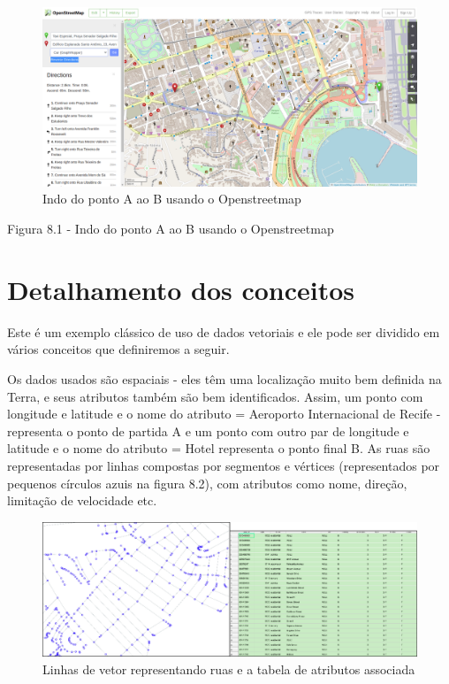 \documentclass[
]{book}
\begin{document}
\begin{figure}
\centering
\includegraphics{media/modulo8/fig81.png}
\caption{Indo do ponto A ao B usando o Openstreetmap}
\end{figure}

Figura 8.1 - Indo do ponto A ao B usando o Openstreetmap

\hypertarget{detalhamento-dos-conceitos-5}{%
\section{Detalhamento dos conceitos}\label{detalhamento-dos-conceitos-5}}

Este é um exemplo clássico de uso de dados vetoriais e ele pode ser dividido em vários conceitos que definiremos a seguir.

Os dados usados \hspace{0pt}\hspace{0pt}são espaciais - eles têm uma localização muito bem definida na Terra, e seus atributos também são bem identificados. Assim, um ponto com longitude e latitude e o nome do atributo = Aeroporto Internacional de Recife - representa o ponto de partida A e um ponto com outro par de longitude e latitude e o nome do atributo = Hotel representa o ponto final B. As ruas são representadas por linhas compostas por segmentos e vértices (representados por pequenos círculos azuis na figura 8.2), com atributos como nome, direção, limitação de velocidade etc.

\begin{figure}
\centering
\includegraphics{media/modulo8/fig82.png}
\caption{Linhas de vetor representando ruas e a tabela de atributos associada}
\end{figure}
\end{document}
